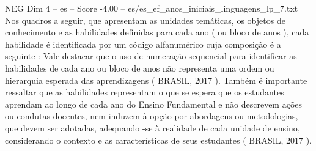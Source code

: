 \begin{textsample}{NEG Dim 4 – es – Score -4.00 – es/es\_ef\_anos\_iniciais\_linguagens\_lp\_7.txt}
Nos quadros a seguir, que apresentam as unidades temáticas, os objetos de conhecimento e as habilidades definidas para cada ano ( ou bloco de anos ), cada habilidade é identificada por um código alfanumérico cuja composição é a seguinte : Vale destacar que o uso de numeração sequencial para identificar as habilidades de cada ano ou bloco de anos não representa uma ordem ou hierarquia esperada das aprendizagens ( BRASIL, 2017 ).
Também é importante ressaltar que as habilidades representam o que se espera que os estudantes aprendam ao longo de cada ano do Ensino Fundamental e não descrevem ações ou condutas docentes, nem induzem à opção por abordagens ou metodologias, que devem ser adotadas, adequando -se à realidade de cada unidade de ensino, considerando o contexto e as características de seus estudantes ( BRASIL, 2017 ).

\end{textsample}
